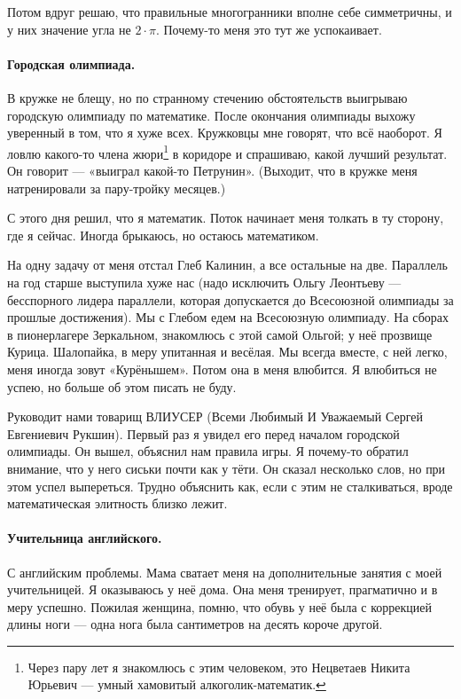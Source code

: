 \documentclass{book}
\begin{document}
Потом вдруг решаю, что правильные многогранники вполне себе симметричны, и у них значение угла не  $2{\cdot}\pi$.
Почему-то меня это тут же успокаивает.

\paragraph{Городская олимпиада.}
В кружке не блещу, 
но по странному стечению обстоятельств выигрываю городскую олимпиаду по математике.
После окончания олимпиады выхожу уверенный в том, что я хуже всех.
Кружковцы мне говорят, что всё наоборот.
Я ловлю какого-то члена жюри\footnote{Через пару лет я знакомлюсь с этим человеком, 
это Нецветаев Никита Юрьевич --- умный хамовитый алкоголик-математик.}  
в коридоре и спрашиваю, какой лучший результат.
Он говорит --- «выиграл какой-то Петрунин».
(Выходит, что в кружке меня натренировали за пару-тройку месяцев.)

С этого дня решил, что я математик.
Поток начинает меня толкать в ту сторону, где я сейчас.
Иногда брыкаюсь, но остаюсь математиком.

На одну задачу от меня отстал Глеб Калинин, а все остальные на две.
Параллель на год старше выступила хуже нас
(надо исключить Ольгу Леонтьеву --- бесспорного лидера параллели, которая допускается до Всесоюзной олимпиады за прошлые достижения).  
Мы с Глебом едем на Всесоюзную олимпиаду.
На сборах в пионерлагере Зеркальном, 
знакомлюсь с этой самой Ольгой; у неё прозвище Курица.
Шалопайка,
в меру упитанная и весёлая.
Мы всегда вместе, с ней легко, меня иногда зовут «Курёнышем».
Потом она в меня влюбится.
Я влюбиться не успею, но больше об этом писать не буду.

Руководит нами товарищ ВЛИУСЕР (Всеми Любимый И Уважаемый Сергей Евгениевич Рукшин).
Первый раз я увидел его перед началом городской олимпиады.
Он вышел, объяснил нам правила игры.
Я почему-то обратил внимание,
что у него сиськи
почти как у тёти.
Он сказал несколько слов, 
но при этом успел выпереться.
Трудно объяснить как, если с этим не сталкиваться, вроде математическая элитность близко лежит.

\paragraph{Учительница английского.}
С английским проблемы.
Мама сватает меня на дополнительные занятия с моей учительницей.
Я оказываюсь у неё дома.
Она меня тренирует, прагматично и в меру успешно.
Пожилая женщина, помню, что обувь у неё была с коррекцией длины ноги --- одна нога была сантиметров на десять короче другой.
\end{document}
